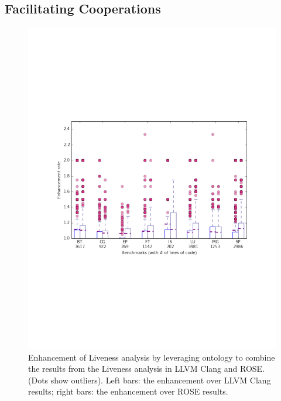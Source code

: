 
\subsection{Facilitating Cooperations}

\begin{figure}
	\centering \includegraphics[width=0.6\columnwidth]{graph/lv_boxplot} \caption{Enhancement
	of Liveness analysis by leveraging ontology to combine the
	results from the Liveness analysis in LLVM Clang and
	ROSE. (Dots show outliers). Left bars: the enhancement over
	LLVM Clang results; right bars: the enhancement over ROSE
	results.}  \label{fig:coop}
\end{figure}

